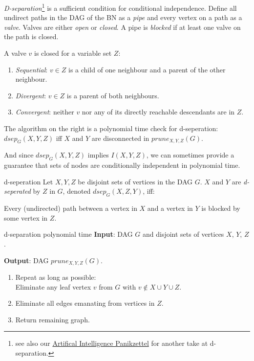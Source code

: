 \documentclass[english]{panikzettel}
\begin{document}
\begin{halfboxl}
    \emph{D-separation}\footnote{see also our \href{https://panikzettel.philworld.de/ai.pdf}{Artifical Intelligence Panikzettel} for another take at d-separation.} is a sufficient condition for conditional independence.
    Define all undirect paths in the DAG of the BN as a \emph{pipe} and every vertex on a path as a \emph{valve}.
    Valves are either \emph{open} or \emph{closed}.
    A pipe is \emph{blocked} if at least one valve on the path is closed.

    A valve $v$ is closed for a variable set $Z$:
    \begin{enumerate}
        \item \emph{Sequential}: $v \in Z$ is a child of one neighbour and a parent of the other neighbour.
        \item \emph{Divergent}: $v \in Z$ is a parent of both neighbours.
        \item \emph{Convergent}: neither $v$ nor any of its directly reachable descendants are in $Z$.
    \end{enumerate}

    The algorithm on the right is a polynomial time check for d-seperation:
    $dsep_G(X,Y,Z)$ iff $X$ and $Y$ are disconnected in $prune_{X,Y,Z}(G)$.

    And since $dsep_G(X,Y,Z)$ implies $I(X,Y,Z)$, we can sometimes provide a guarantee that sets of nodes are conditionally independent in polynomial time.
\end{halfboxl}%
\begin{halfboxr}
    \vspace{-\baselineskip}
    \begin{defi}{d-seperation}
        Let $X,Y,Z$ be disjoint sets of vertices in the DAG $G$.
        $X$ and $Y$ are \emph{d-seperated} by $Z$ in $G$, denoted $dsep_G(X,Z,Y)$, iff:

        Every (undirected) path between a vertex in $X$ and a vertex in $Y$ is blocked by some vertex in $Z$.
    \end{defi}

    \begin{algo}{d-separation polynomial time}
        \textbf{Input}: DAG $G$ and disjoint sets of vertices $X$, $Y$, $Z$.

        \textbf{Output}: DAG $prune_{X,Y,Z}(G)$.
        \tcblower
        \begin{enumerate}
            \item Repeat as long as possible: \\
                  Eliminate any leaf vertex $v$ from $G$ with $v \notin X \cup Y \cup Z$.
            \item Eliminate all edges emanating from  vertices in $Z$.
            \item Return remaining graph.
        \end{enumerate}
    \end{algo}
\end{halfboxr}
\end{document}
